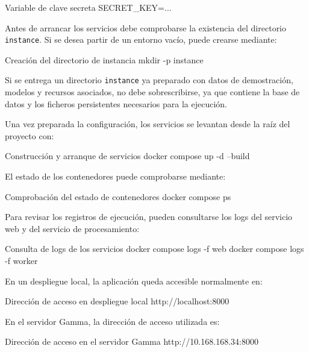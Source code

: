 \begin{infocmdbox}{Variable de clave secreta}
SECRET_KEY=...
\end{infocmdbox}

Antes de arrancar los servicios debe comprobarse la existencia del directorio \texttt{instance}. Si se desea partir de un entorno vacío, puede crearse mediante:

\begin{dockerbox}{Creación del directorio de instancia}
mkdir -p instance
\end{dockerbox}

Si se entrega un directorio \texttt{instance} ya preparado con datos de demostración, modelos y recursos asociados, no debe sobrescribirse, ya que contiene la base de datos y los ficheros persistentes necesarios para la ejecución.

Una vez preparada la configuración, los servicios se levantan desde la raíz del proyecto con:

\begin{dockerbox}{Construcción y arranque de servicios}
docker compose up -d --build
\end{dockerbox}

El estado de los contenedores puede comprobarse mediante:

\begin{dockerbox}{Comprobación del estado de contenedores}
docker compose ps
\end{dockerbox}

Para revisar los registros de ejecución, pueden consultarse los logs del servicio web y del servicio de procesamiento:

\begin{dockerbox}{Consulta de logs de los servicios}
docker compose logs -f web
docker compose logs -f worker
\end{dockerbox}

En un despliegue local, la aplicación queda accesible normalmente en:

\begin{infocmdbox}{Dirección de acceso en despliegue local}
http://localhost:8000
\end{infocmdbox}

En el servidor Gamma, la dirección de acceso utilizada es:

\begin{infocmdbox}{Dirección de acceso en el servidor Gamma}
http://10.168.168.34:8000
\end{infocmdbox}

